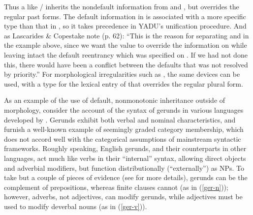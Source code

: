 \documentclass[output=paper
                ,modfonts
                ,nonflat
	        ,collection
	        ,collectionchapter
	        ,collectiontoclongg
 	        ,biblatex
                ,babelshorthands
                ,newtxmath
                ,draftmode
                ,colorlinks, citecolor=brown
]{./langsci/langscibook}
\begin{document}
{Thus a  like / inherits the nondefault information from  and , but overrides the regular past forms.
The default information in  is associated with a more specific type than that in , so it takes precedence in YADU's unification procedure.
And as Lascarides \& Copestake note (p. 62): ``This is the reason for separating  and  in the example above, since we want the  value to override the  information on  while leaving intact the default reentrancy which was specified on .  If we had not done this, there would have been a conflict between the defaults that was not resolved by priority.'' For morphological irregularities such as , the same devices can be used, with a type for the lexical entry of  that overrides the regular plural form.

As an example of the use of default, nonmonotonic inheritance outside of morphology, consider the account of the syntax of gerunds in various languages developed by \citet{Malouf2000a}. 
Gerunds exhibit both verbal and nominal characteristics, and furnish a well-known example of seemingly graded category membership, which does not accord well with the categorical assumptions of mainstream syntactic frameworks.
Roughly speaking, English gerunds, and their counterparts in other languages, act much like verbs in their ``internal'' syntax, allowing direct objects and adverbial modifiers, but function distributionally (``externally'') as NPs.
To take but a couple of pieces of evidence (see \citealt[27--33]{Malouf2000a} for more details), 
gerunds can be the complement of prepositions, whereas finite clauses cannot (as in (\ref{ger-n})); however, adverbs, not adjectives, can modify gerunds, while adjectives must be used to modify deverbal nouns (as in (\ref{ger-v})).


\eal
\label{ger-n}
\zlcont
\ealcont
\label{ger-v}
\zl


}
\end{document}

